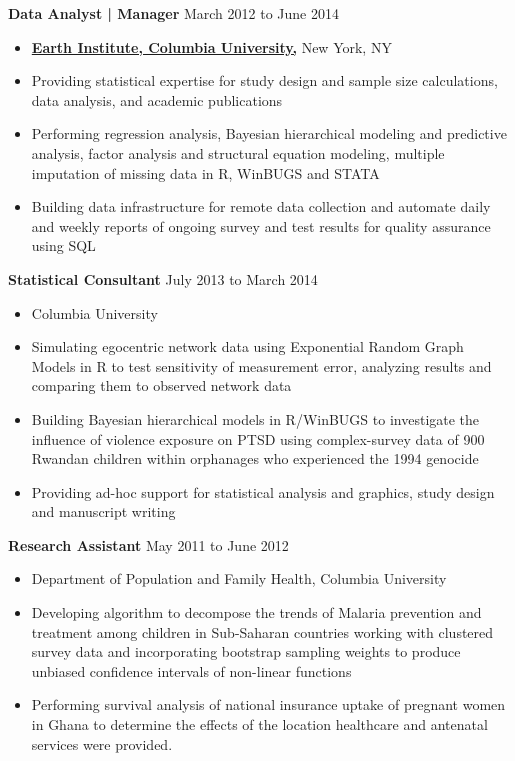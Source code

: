 \documentclass[11pt]{article}
\newenvironment{innerlist}[1][\enskip\textbullet]%
        {\begin{itemize}[#1,leftmargin=*,parsep=0pt,itemsep=0pt,topsep=0pt,partopsep=0pt]}
        {\end{itemize}}
\begin{document}
\textbf{Data Analyst | Manager} \hfill {March 2012 to June 2014}
\begin{innerlist}
\item[] \href{http://www.ei.columbia.edu}{\textbf{Earth Institute, Columbia University,}} New York, NY\\
\item Providing statistical expertise for study design and sample size calculations, data analysis, and academic publications
\item Performing regression analysis, Bayesian hierarchical modeling and predictive analysis, factor analysis and structural equation modeling, multiple imputation of missing data in R, WinBUGS and STATA
\item Building data infrastructure for remote data collection and automate daily and weekly reports of ongoing survey and test results for quality assurance using SQL\\
\end{innerlist}

\textbf{Statistical Consultant} \hfill {July 2013 to March 2014}
\begin{innerlist}
\item[] Columbia University\\
\item Simulating egocentric network data using Exponential Random Graph Models in R to test sensitivity of measurement error, analyzing results and comparing them to observed network data
\item Building Bayesian hierarchical models in R/WinBUGS to investigate the influence of violence exposure on
PTSD using complex-survey data of 900 Rwandan children within orphanages who experienced the 1994 genocide
\item Providing ad-hoc support for statistical analysis and graphics, study design and manuscript writing\\
\end{innerlist}

\textbf{Research Assistant} \hfill {May 2011 to June 2012}
\begin{innerlist}
\item[] Department of Population and Family Health, Columbia University\\
\item Developing algorithm to decompose the trends of Malaria prevention and treatment among children in Sub-Saharan countries working with clustered survey data and incorporating bootstrap sampling weights to produce unbiased confidence intervals of non-linear functions
\item Performing survival analysis of national insurance uptake of pregnant women in Ghana to determine the effects of the location healthcare and antenatal services were provided.\\
\end{innerlist}
\end{document}

